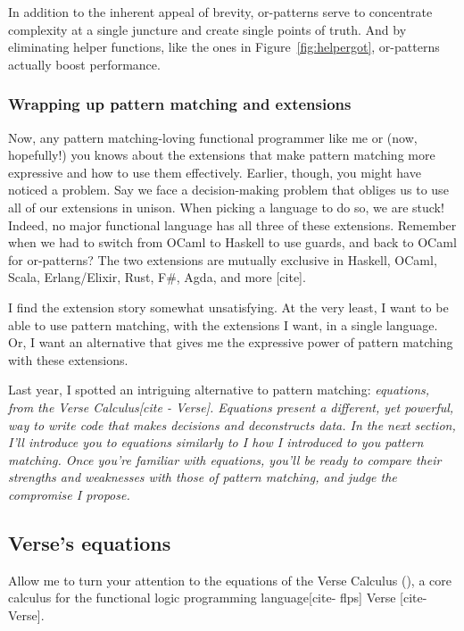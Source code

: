 \documentclass[manuscript,screen,review, 12pt, nonacm]{acmart}
\begin{document}
\begin{outline}[enumerate]
    In addition to the inherent appeal of brevity, or-patterns serve to
    concentrate complexity at a single juncture and create single points of
    truth. And by eliminating helper functions, like the ones in
    Figure~\ref{fig:helpergot}, or-patterns actually boost performance.
      
    \subsubsection{Wrapping up pattern matching and extensions}
    
    Now, any pattern matching-loving functional programmer like me or (now,
    hopefully!) you knows about the extensions that make pattern matching more
    expressive and how to use them effectively. Earlier, though, you might have
    noticed a problem. Say we face a decision-making problem that obliges us to
    use all of our extensions in unison. When picking a language to do so, we
    are stuck! Indeed, no major functional language has all three of these
    extensions. Remember when we had to switch from OCaml to Haskell to use
    guards, and back to OCaml for or-patterns? The two extensions are mutually
    exclusive in Haskell, OCaml, Scala, Erlang/Elixir, Rust, F\#, Agda, and more
    [cite]. 


    I find the extension story somewhat unsatisfying. At the very least, I want
    to be able to use pattern matching, with the extensions I want, in a single
    language. Or, I want an alternative that gives me the expressive power of
    pattern matching with these extensions. 

    Last year, I spotted an intriguing alternative to pattern matching:
    \it{equations}, from the Verse Calculus[cite - Verse]. Equations present a
    different, yet powerful, way to write code that makes decisions and
    deconstructs data. In the next section, I'll introduce you to equations
    similarly to I how I introduced to you pattern matching. Once you're
    familiar with equations, you'll be ready to compare their strengths and
    weaknesses with those of pattern matching, and judge the compromise I
    propose. 

\subsection{Verse's equations}
    \label{verseoverobservers}

    Allow me to turn your attention to the equations of the Verse Calculus (\VC),
    a core calculus for the functional logic programming language[cite- flps]
    Verse [cite- Verse]. 


\end{outline}
\end{document}
